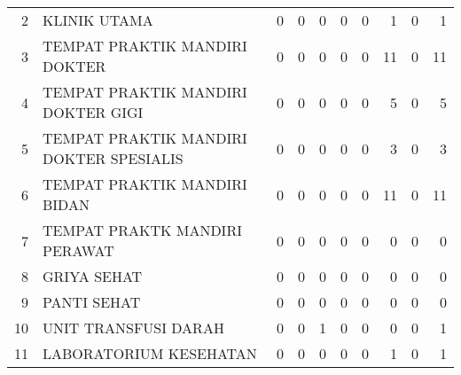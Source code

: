{\begin{small}
\begin{tabular}{rY{22em}rrrrrrrr}
    2 & KLINIK UTAMA & 0 & 0 & 0 & 0 & 0 & 1 & 0 & 1 \\
    3 & TEMPAT PRAKTIK MANDIRI DOKTER   & 0 & 0 & 0 & 0 & 0 & 11 & 0 & 11 \\
    4 & TEMPAT PRAKTIK MANDIRI DOKTER GIGI & 0 & 0 & 0 & 0 & 0 & 5 & 0 & 5 \\
    5 & TEMPAT PRAKTIK MANDIRI DOKTER SPESIALIS & 0 & 0 & 0 & 0 & 0 & 3 & 0 & 3 \\
    6 & TEMPAT PRAKTIK MANDIRI BIDAN & 0 & 0 & 0 & 0 & 0 & 11 & 0 & 11 \\
    7 & TEMPAT PRAKTK MANDIRI PERAWAT & 0 & 0 & 0 & 0 & 0 & 0 & 0 & 0 \\
    8 & GRIYA SEHAT & 0 & 0 & 0 & 0 & 0 & 0 & 0 & 0 \\
    9 & PANTI SEHAT & 0 & 0 & 0 & 0 & 0 & 0 & 0 & 0 \\
    10 & UNIT TRANSFUSI DARAH & 0 & 0 & 1 & 0 & 0 & 0 & 0 & 1 \\
    11 & LABORATORIUM KESEHATAN & 0 & 0 & 0 & 0 & 0 & 1 & 0 & 1 \\

\end{tabular}%


\end{small}}
